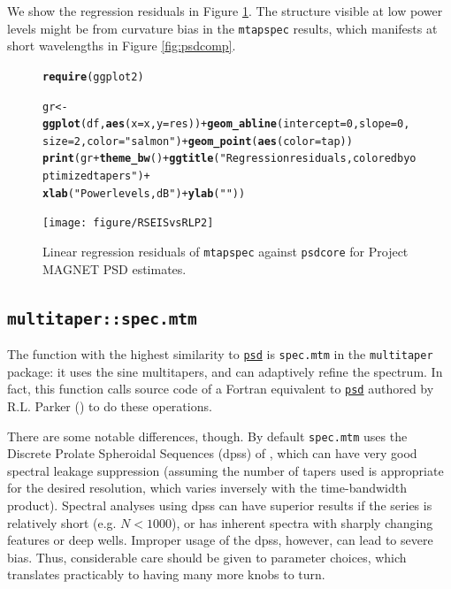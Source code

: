 \documentclass[10pt]{article}\usepackage{graphicx, color}
\makeatletter
\newcommand{\hlfunctioncall}[1]{\textcolor[rgb]{0.501960784313725,0,0.329411764705882}{\textbf{#1}}}%
\newcommand{\hlstring}[1]{\textcolor[rgb]{0.6,0.6,1}{#1}}%
\newenvironment{kframe}{%
 \def\at@end@of@kframe{}%
 \ifinner\ifhmode%
  \def\at@end@of@kframe{\end{minipage}}%
  \begin{minipage}{\columnwidth}%
 \fi\fi%
 \def\FrameCommand##1{\hskip\@totalleftmargin \hskip-\fboxsep
 \colorbox{shadecolor}{##1}\hskip-\fboxsep
     \hskip-\linewidth \hskip-\@totalleftmargin \hskip\columnwidth}%
 \MakeFramed {\advance\hsize-\width
   \@totalleftmargin\z@ \linewidth\hsize
   \@setminipage}}%
 {\par\unskip\endMakeFramed%
 \at@end@of@kframe}
\newenvironment{knitrout}{}{} %
\newcommand{\Rcmd}[1]{\texttt{#1}}
\newcommand{\psd}[0]{\href{http://abarbour.github.com/psd/}{\color{blue}\Rcmd{psd}}}
\makeatother
\begin{document}
We show the regression residuals in Figure \ref{fig:psdreg}.  
The structure visible
at low power levels might be from curvature bias in
the \Rcmd{mtapspec} results, which
manifests at short wavelengths
in Figure \ref{fig:psdcomp}.

\begin{figure}[htb!]
\begin{center}
\begin{knitrout}
\color{fgcolor}\begin{kframe}
\begin{alltt}
\hlfunctioncall{require}(ggplot2)
\end{alltt}


{\ttfamily\noindent\itshape\color{messagecolor}{\#\# Loading required package: ggplot2}}\begin{alltt}
gr <- \hlfunctioncall{ggplot}(df, \hlfunctioncall{aes}(x = x, y = res)) + \hlfunctioncall{geom_abline}(intercept = 0, slope = 0, 
    size = 2, color = \hlstring{"salmon"}) + \hlfunctioncall{geom_point}(\hlfunctioncall{aes}(color = tap))
\hlfunctioncall{print}(gr + \hlfunctioncall{theme_bw}() + \hlfunctioncall{ggtitle}(\hlstring{"Regression residuals, colored by optimized tapers"}) + 
    \hlfunctioncall{xlab}(\hlstring{"Power levels, dB"}) + \hlfunctioncall{ylab}(\hlstring{""}))
\end{alltt}
\end{kframe}
\texttt{[image: figure/RSEISvsRLP2]} 

\end{knitrout}

\caption{Linear regression residuals of
\Rcmd{mtapspec} against \Rcmd{psdcore} for Project MAGNET PSD estimates.}
\label{fig:psdreg}
\end{center}
\end{figure}

\subsection{\Rcmd{multitaper::spec.mtm}}
The function with the highest similarity to \psd{} is
\Rcmd{spec.mtm} in the \Rcmd{multitaper} package: it uses
the sine multitapers, and can adaptively refine the spectrum.
In fact, this function
calls source code of a Fortran equivalent to \psd{}
authored by R.L. Parker (\citeyear{parkerweb}) to do these operations.

There are some notable differences, though.  
By default \Rcmd{spec.mtm}
 uses the Discrete Prolate Spheroidal Sequences (dpss) 
of \citet{thomson1982},
which can have very good spectral leakage suppression (assuming
the number of tapers used is appropriate for the 
desired resolution, which varies inversely with the time-bandwidth product).
Spectral analyses using dpss can have superior results if the series is
relatively short (e.g. $N < 1000$), or has inherent spectra
with sharply changing features or
deep wells.
Improper usage of the dpss, however, can lead to severe bias.
Thus, considerable care should be given to parameter choices, 
which translates practicably
to having many more knobs to turn.
\end{document}
